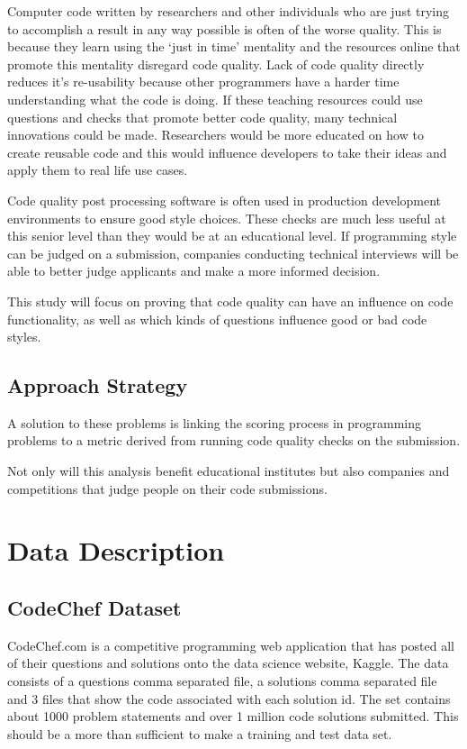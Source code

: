 \documentclass{article}
\begin{document}
Computer code written by researchers and other individuals who are just
trying to accomplish a result in any way possible is often of the worse
quality. This is because they learn using the `just in time' mentality
and the resources online that promote this mentality disregard code
quality. \citet{justintimeteaching} Lack of code quality directly
reduces it's re-usability because other programmers have a harder time
understanding what the code is doing. If these teaching resources could
use questions and checks that promote better code quality, many
technical innovations could be made. Researchers would be more educated
on how to create reusable code and this would influence developers to
take their ideas and apply them to real life use cases.
\citet{reusability}

Code quality post processing software is often used in production
development environments to ensure good style choices. These checks are
much less useful at this senior level than they would be at an
educational level. If programming style can be judged on a submission,
companies conducting technical interviews will be able to better judge
applicants and make a more informed decision.

This study will focus on proving that code quality can have an influence
on code functionality, as well as which kinds of questions influence
good or bad code styles.

\subsection{Approach Strategy}\label{approach-strategy}

A solution to these problems is linking the scoring process in
programming problems to a metric derived from running code quality
checks on the submission.

Not only will this analysis benefit educational institutes but also
companies and competitions that judge people on their code submissions.

\section{Data Description}\label{data-description}

\subsection{CodeChef Dataset}\label{codechef-dataset}

CodeChef.com is a competitive programming web application that has
posted all of their questions and solutions onto the data science
website, Kaggle. The data consists of a questions comma separated file,
a solutions comma separated file and 3 files that show the code
associated with each solution id. The set contains about 1000 problem
statements and over 1 million code solutions submitted. This should be a
more than sufficient to make a training and test data set.
\end{document}
